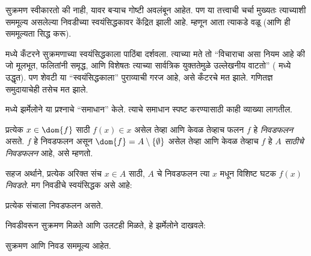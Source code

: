 \documentclass[../../../include/open-logic-section]{subfiles}
\begin{document}

सुक्रमण स्वीकारतो की नाही, यावर बऱ्याच गोष्टी अवलंबून आहेत. पण या तत्त्वाची चर्चा मुख्यतः त्याच्याशी सममूल्य असलेल्या निवडीच्या स्वयंसिद्धकावर केंद्रित झाली आहे. म्हणून आता त्याकडे वळू (आणि ही सममूल्यता सिद्ध करू).

\citeyear{Cantor1883} मध्ये कँटरने सुक्रमणाच्या स्वयंसिद्धकाला पाठिंबा दर्शवला. त्याच्या मते तो “विचाराचा असा नियम आहे की जो मूलभूत, फलितांनी समृद्ध, आणि विशेषतः त्याच्या सार्वत्रिक युक्ततेमुळे उल्लेखनीय वाटतो” (\citeauthor{Potter2004} \citeyear[पृ.~243]{Potter2004} मध्ये उद्धृत). पण शेवटी या “स्वयंसिद्धकाला” पुराव्याची गरज आहे, असे कँटरचे मत झाले. गणितज्ञ समुदायाचेही तसेच मत झाले.

\citeyear{Zermelo1904} मध्ये झर्मेलोने या प्रश्नाचे “समाधान” केले. त्याचे समाधान स्पष्ट करण्यासाठी काही व्याख्या लागतील.

\begin{defn}
प्रत्येक $x \in \dom{f}$ साठी $f(x) \in x$ असेल तेव्हा आणि केवळ तेव्हाच फलन $f$ हे \emph{निवडफलन} असते. $f$ हे निवडफलन असून $\dom{f} = A \setminus \{\emptyset\}$ असेल तेव्हा आणि केवळ तेव्हाच $f$ हे \emph{$A$ साठीचे निवडफलन} आहे, असे म्हणतो.
\end{defn}

सहज अर्थाने, प्रत्येक अरिक्त संच $x \in A$ साठी, $A$ चे निवडफलन त्या $x$ मधून विशिष्ट घटक $f(x)$ \emph{निवडते}. मग निवडीचे स्वयंसिद्धक असे आहे:

\begin{axiom}[निवड]
	प्रत्येक संचाला निवडफलन असते.
\end{axiom}

निवडीवरून सुक्रमण मिळते आणि उलटही मिळते, हे झर्मेलोने दाखवले:

\begin{thm}[$\ZF$ मध्ये]
सुक्रमण आणि निवड सममूल्य आहेत.
\end{thm}
\end{document}
